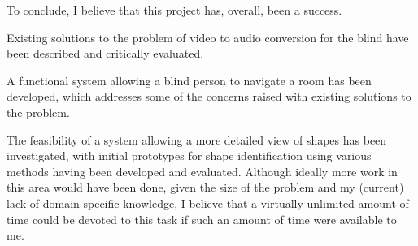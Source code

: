 To conclude, I believe that this project has, overall, been a success.

Existing solutions to the problem of video to audio conversion for the blind have been described and critically evaluated.

A functional system allowing a blind person to navigate a room has been developed, which addresses some of the concerns raised with existing solutions to the problem.

The feasibility of a system allowing a more detailed view of shapes has been investigated, with initial prototypes for shape identification using various methods having been developed and evaluated. Although ideally more work in this area would have been done, given the size of the problem and my (current) lack of domain-specific knowledge, I believe that a virtually unlimited amount of time could be devoted to this task if such an amount of time were available to me.
